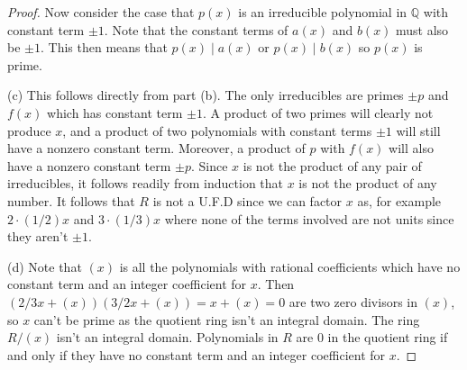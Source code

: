 \documentclass{article}
\begin{document}
\begin{proof}
Now consider the case that $p(x)$ is an irreducible polynomial in $\mathbb{Q}$ with constant term $\pm 1$. Note that the constant terms of $a(x)$ and $b(x)$ must also be $\pm 1$. This then means that $p(x) \mid a(x)$ or $p(x) \mid b(x)$ so $p(x)$ is prime.

(c) This follows directly from part (b). The only irreducibles are primes $\pm p$ and $f(x)$ which has constant term $\pm 1$. A product of two primes will clearly not produce $x$, and a product of two polynomials with constant terms $\pm 1$ will still have a nonzero constant term. Moreover, a product of $p$ with $f(x)$ will also have a nonzero constant term $\pm p$. Since $x$ is not the product of any pair of irreducibles, it follows readily from induction that $x$ is not the product of any number. It follows that $R$ is not a U.F.D since we can factor $x$ as, for example $2 \cdot (1/2)x$ and $3 \cdot (1/3)x$ where none of the terms involved are not units since they aren't $\pm 1$.

(d) Note that $(x)$ is all the polynomials with rational coefficients which have no constant term and an integer coefficient for $x$. Then $(2/3x + (x))(3/2x + (x)) = x + (x) = 0$ are two zero divisors in $(x)$, so $x$ can't be prime as the quotient ring isn't an integral domain. The ring $R/(x)$ isn't an integral domain. Polynomials in $R$ are $0$ in the quotient ring if and only if they have no constant term and an integer coefficient for $x$.
\end{proof}
\end{document}
